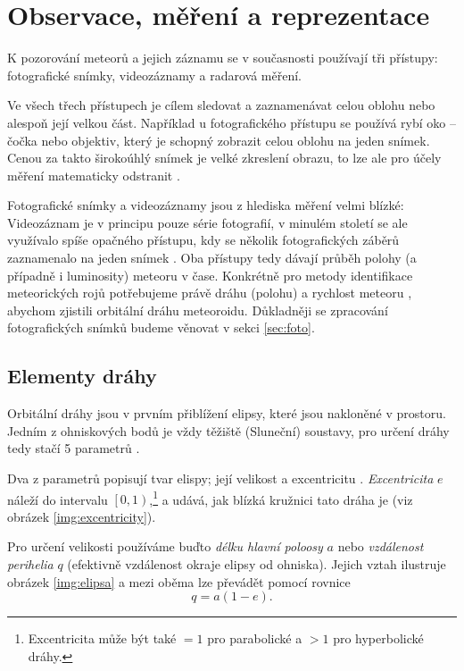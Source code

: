 \chapter{Observace, měření a reprezentace}
K pozorování meteorů a jejich záznamu se v současnosti používají tři přístupy: fotografické snímky, videozáznamy a radarová měření.

Ve všech třech přístupech je cílem sledovat a zaznamenávat celou oblohu nebo alespoň její velkou část. Například u fotografického přístupu se používá rybí oko \cite{ceplecha} -- čočka nebo objektiv, který je schopný zobrazit celou oblohu na jeden snímek. Cenou za takto širokoúhlý snímek je velké zkreslení obrazu, to lze ale pro účely měření matematicky odstranit \cite{ceplecha}.


Fotografické snímky a videozáznamy jsou z hlediska měření velmi blízké: Videozáznam je v principu pouze série fotografií, v minulém století se ale využívalo spíše opačného přístupu, kdy se několik fotografických záběrů zaznamenalo na jeden snímek \cite{ceplecha}. Oba přístupy tedy dávají průběh polohy (a případně i luminosity) meteoru v čase. Konkrétně pro metody identifikace meteorických rojů potřebujeme právě dráhu (polohu) a rychlost meteoru \cite{ceplecha}, abychom zjistili orbitální dráhu meteoroidu. Důkladněji se zpracování fotografických snímků budeme věnovat v sekci \ref{sec:foto}.

\section{Elementy dráhy}
Orbitální dráhy jsou v prvním přiblížení elipsy, které jsou nakloněné v prostoru. Jedním z ohniskových bodů je vždy těžiště (Sluneční) soustavy, pro určení dráhy tedy stačí 5 parametrů \cite{astro}.

\medskip

Dva z parametrů popisují tvar elispy; její velikost a excentricitu \cite{astro}. \textit{Excentricita} $e$ náleží do intervalu $\left[0,1\right)$,\footnote{Excentricita může být také $=1$ pro parabolické a $>1$ pro hyperbolické dráhy. } a udává, jak blízká kružnici tato dráha je (viz obrázek \ref{img:excentricity}).


Pro určení velikosti používáme buďto \textit{délku hlavní poloosy} $a$ nebo \textit{vzdálenost perihelia} $q$ (efektivně vzdálenost okraje elipsy od ohniska). Jejich vztah ilustruje obrázek \ref{img:elipsa} a mezi oběma lze převádět pomocí rovnice \cite{ceplecha}
$$
    q=a(1-e)\text{.}
$$

